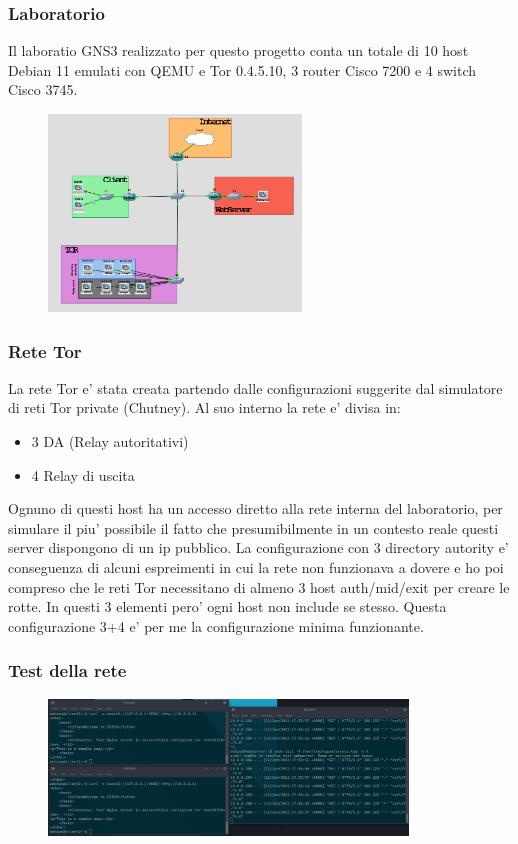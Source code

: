 \documentclass{beamer}[10pt]
\begin{document}
\begin{frame}
  \frametitle{Laboratorio}
  Il laboratio GNS3 realizzato per questo progetto conta un totale di 10 host Debian 11 emulati con QEMU e Tor 0.4.5.10, 3 router Cisco 7200 e 4 switch Cisco 3745.
  \begin{figure}
    \centering
    \includegraphics[width=0.60\textwidth]{../img/topology.png}
  \end{figure}

\end{frame}

\begin{frame}
  \frametitle{Rete Tor}
  La rete Tor e' stata creata partendo dalle configurazioni suggerite dal simulatore di reti Tor private (Chutney). Al suo interno la rete e' divisa in:
  \begin{itemize}
    \item 3 DA (Relay autoritativi)
    \item 4 Relay di uscita
  \end{itemize}
  Ognuno di questi host ha un accesso diretto alla rete interna del laboratorio, per simulare il piu' possibile il fatto che presumibilmente in un contesto reale questi server dispongono di un ip pubblico.
  La configurazione con 3 directory autority e' conseguenza di alcuni espreimenti in cui la rete non funzionava a dovere e ho poi compreso che le reti Tor necessitano di almeno 3 host auth/mid/exit per creare le rotte. 
  In questi 3 elementi pero' ogni host non include se stesso. Questa configurazione 3+4 e' per me la configurazione minima funzionante.
\end{frame}


\begin{frame}
  \frametitle{Test della rete}
  \begin{figure}
    \centering
    \includegraphics[width=0.851\textwidth]{../img/terminali_2.png}
  \end{figure}
\end{frame}
\end{document}
